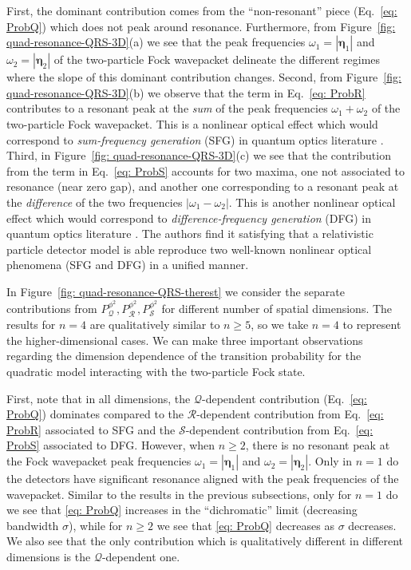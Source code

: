 \documentclass[prd,twocolumn,superscriptaddress,nofootinbib,floatfix,amsmath,amssymb]{revtex4-2}
\newcommand{\ba}{{\bm{\eta}_1}}
\newcommand{\bb}{{\bm{\eta}_2}}
\begin{document}
    First, the dominant contribution comes from the ``non-resonant'' piece (Eq.~\eqref{eq: ProbQ}) which  does not peak around resonance. Furthermore, from Figure~\ref{fig: quad-resonance-QRS-3D}(a) we see that the peak frequencies $\omega_1=|\ba| $ and $ \omega_2 = |\bb|$ of the two-particle Fock wavepacket delineate the different regimes where the slope of this dominant contribution changes. Second, from Figure~\ref{fig: quad-resonance-QRS-3D}(b) we observe that the term in Eq.~\eqref{eq: ProbR} contributes to a resonant peak at the \textit{sum} of the peak frequencies $\omega_1+\omega_2$ of the two-particle Fock wavepacket. This is a nonlinear optical effect which would correspond to \textit{sum-frequency generation} (SFG) in quantum optics literature \cite{boyd2008nonlinear}. Third, in Figure~\ref{fig: quad-resonance-QRS-3D}(c) we see that the contribution from the term in Eq.~\eqref{eq: ProbS} accounts for two maxima, one not associated to resonance (near zero gap), and another one corresponding to a resonant peak at the \textit{difference} of the two frequencies $\left|\omega_1-\omega_2\right|$. This is another nonlinear optical effect which would correspond to \textit{difference-frequency generation} (DFG) in quantum optics literature \cite{boyd2008nonlinear}. 
    The authors find it satisfying that a relativistic particle detector model is able reproduce two well-known nonlinear optical phenomena (SFG and DFG) in a unified manner.
    
    In Figure~\ref{fig: quad-resonance-QRS-therest} we consider the separate contributions from $P^{\phi^2}_{\mathcal{Q}},P^{\phi^2}_{\mathcal{R}},P^{\phi^2}_{\mathcal{S}}$ for different number of spatial dimensions. The results for $n=4$ are qualitatively similar to $n\geq 5$, so we take $n = 4$ to represent the higher-dimensional cases. We can make three important observations regarding the dimension dependence of the transition probability for the quadratic model interacting with the two-particle Fock state.
    
    First, note that in all dimensions, the $\mathcal{Q}$-dependent contribution (Eq.~\eqref{eq: ProbQ}) dominates compared to the $\mathcal{R}$-dependent contribution from Eq.~\eqref{eq: ProbR} associated to SFG and the $\mathcal{S}$-dependent contribution from Eq.~\eqref{eq: ProbS} associated to DFG. However, when $n\geq 2$, there is no resonant peak at the Fock wavepacket peak frequencies $\omega_1=|\ba|$ and $\omega_2=|\bb|$. Only in $n=1$ do the detectors have significant resonance aligned with the peak frequencies of the wavepacket. Similar to the results in the previous subsections, only for $n=1$ do we see that \eqref{eq: ProbQ} increases in the ``dichromatic'' limit (decreasing bandwidth $\sigma$), while for $n\geq 2$ we see that \eqref{eq: ProbQ} decreases as $\sigma$ decreases. We also see that the only contribution which is qualitatively different in different dimensions is the $\mathcal{Q}$-dependent one.
    
\end{document}
